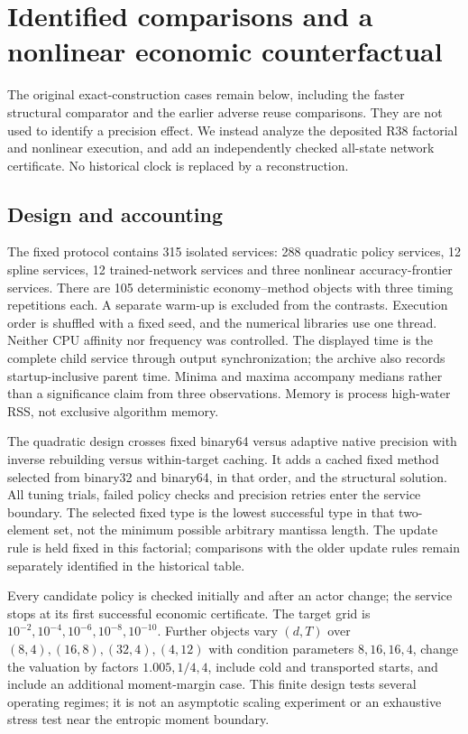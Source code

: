 \section{Identified comparisons and a nonlinear economic counterfactual}
\label{sec:r39evidence}

The original exact-construction cases remain below, including the faster
structural comparator and the earlier adverse reuse comparisons. They are not
used to identify a precision effect. We instead analyze the deposited R38
factorial and nonlinear execution, and add an independently checked all-state
network certificate. No historical clock is replaced by a reconstruction.

\subsection{Design and accounting}
The fixed protocol contains 315 isolated services: 288 quadratic policy
services, 12 spline services, 12 trained-network services and three nonlinear
accuracy-frontier services. There are 105 deterministic economy--method objects
with three timing repetitions each. A separate warm-up is excluded from the
contrasts. Execution order is shuffled with a fixed seed, and the numerical
libraries use one thread. Neither CPU affinity nor frequency was controlled.
The displayed time is the complete child service through output synchronization;
the archive also records startup-inclusive parent time. Minima and maxima
accompany medians rather than a significance claim from three observations.
Memory is process high-water RSS, not exclusive algorithm memory.

The quadratic design crosses fixed binary64 versus adaptive native precision
with inverse rebuilding versus within-target caching. It adds a cached fixed
method selected from binary32 and binary64, in that order, and the structural
solution. All tuning trials, failed policy checks and precision retries enter
the service boundary. The selected fixed type is the lowest successful type in
that two-element set, not the minimum possible arbitrary mantissa length.
The update rule is held fixed in this factorial; comparisons with the older
update rules remain separately identified in the historical table.

Every candidate policy is checked initially and after an actor change; the
service stops at its first successful economic certificate. The target grid is
$10^{-2},10^{-4},10^{-6},10^{-8},10^{-10}$. Further objects vary $(d,T)$ over
$(8,4),(16,8),(32,4),(4,12)$ with condition parameters $8,16,16,4$, change the
valuation by factors $1.005,1/4,4$, include cold and transported starts, and
include an additional moment-margin case. This finite design tests several
operating regimes; it is not an asymptotic scaling experiment or an exhaustive
stress test near the entropic moment boundary.

